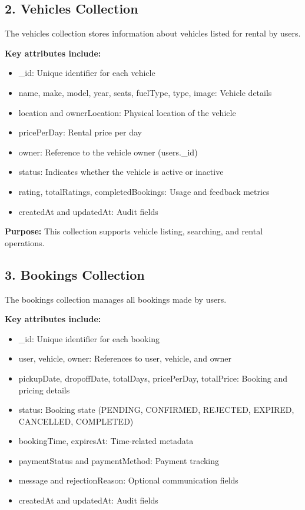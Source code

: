 \documentclass[12pt,a4paper]{report}
\begin{document}
\subsection*{2. Vehicles Collection}

The vehicles collection stores information about vehicles listed for rental by users.

\textbf{Key attributes include:}
\begin{itemize}
	\item \_id: Unique identifier for each vehicle
	\item name, make, model, year, seats, fuelType, type, image: Vehicle details
	\item location and ownerLocation: Physical location of the vehicle
	\item pricePerDay: Rental price per day
	\item owner: Reference to the vehicle owner (users.\_id)
	\item status: Indicates whether the vehicle is active or inactive
	\item rating, totalRatings, completedBookings: Usage and feedback metrics
	\item createdAt and updatedAt: Audit fields
\end{itemize}

\textbf{Purpose:} This collection supports vehicle listing, searching, and rental operations.

\subsection*{3. Bookings Collection}

The bookings collection manages all bookings made by users.

\textbf{Key attributes include:}
\begin{itemize}
	\item \_id: Unique identifier for each booking
	\item user, vehicle, owner: References to user, vehicle, and owner
	\item pickupDate, dropoffDate, totalDays, pricePerDay, totalPrice: Booking and pricing details
	\item status: Booking state (PENDING, CONFIRMED, REJECTED, EXPIRED, CANCELLED, COMPLETED)
	\item bookingTime, expiresAt: Time-related metadata
	\item paymentStatus and paymentMethod: Payment tracking
	\item message and rejectionReason: Optional communication fields
	\item createdAt and updatedAt: Audit fields
\end{itemize}
\end{document}
